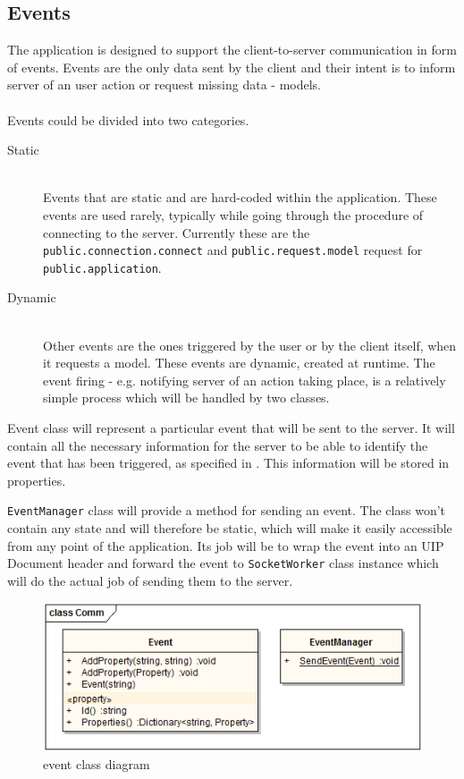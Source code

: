 \subsection{Events}
The application is designed to support the client-to-server communication in form of events. Events are the only data sent by the client and their intent is to inform server of an user action or request missing data - models.\\\\
Events could be divided into two categories.\\
\begin{description}
  \item[Static] \hfill \\
 Events that are static and are hard-coded within the application. These events are used rarely, typically while going through the procedure of connecting to the server. Currently these are the \texttt{public.connection.connect} and \texttt{public.request.model} request for \texttt{public.application}.
  \item[Dynamic] \hfill \\
 Other events are the ones triggered by the user or by the client itself, when it requests a model. These events are dynamic, created at runtime. The event firing - e.g. notifying server of an action taking place, is a relatively simple process which will be handled by two classes.
\end{description}
Event class will represent a particular event that will be sent to the server. It will contain all the necessary information for the server to be able to identify the event that has been triggered, as specified in \cite{uip}. This information will be stored in properties.

\texttt{EventManager} class will provide a method for sending an event. The class won't contain any state and will therefore be static, which will make it easily accessible from any point of the application. Its job will be to wrap the event into an UIP Document header and forward the event to \texttt{SocketWorker} class instance which will do the actual job of sending them to the server.


\begin{figure}[ht!]
\centering
\includegraphics[width=130mm]{pics/3/classEvent.png}
\caption{event class diagram}
\label{fig:classEvent}
\end{figure}

